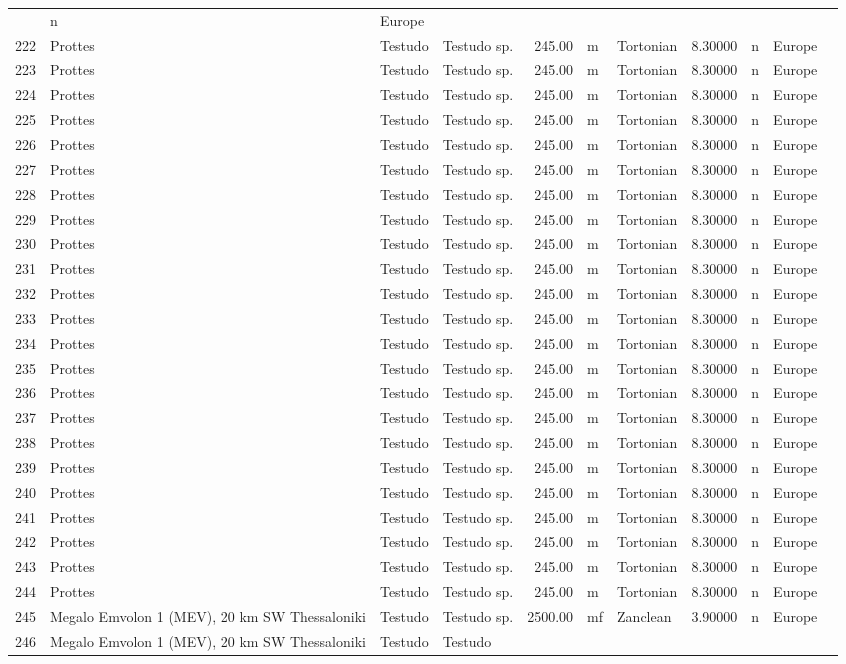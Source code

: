 \begin{landscape}
{\begin{longtable}[]{@{}llllrllrlll@{}}
	& n & Europe\tabularnewline
	222 & Prottes & Testudo & Testudo sp. & 245.00 & m & Tortonian & 8.30000
	& n & Europe\tabularnewline
	223 & Prottes & Testudo & Testudo sp. & 245.00 & m & Tortonian & 8.30000
	& n & Europe\tabularnewline
	224 & Prottes & Testudo & Testudo sp. & 245.00 & m & Tortonian & 8.30000
	& n & Europe\tabularnewline
	225 & Prottes & Testudo & Testudo sp. & 245.00 & m & Tortonian & 8.30000
	& n & Europe\tabularnewline
	226 & Prottes & Testudo & Testudo sp. & 245.00 & m & Tortonian & 8.30000
	& n & Europe\tabularnewline
	227 & Prottes & Testudo & Testudo sp. & 245.00 & m & Tortonian & 8.30000
	& n & Europe\tabularnewline
	228 & Prottes & Testudo & Testudo sp. & 245.00 & m & Tortonian & 8.30000
	& n & Europe\tabularnewline
	229 & Prottes & Testudo & Testudo sp. & 245.00 & m & Tortonian & 8.30000
	& n & Europe\tabularnewline
	230 & Prottes & Testudo & Testudo sp. & 245.00 & m & Tortonian & 8.30000
	& n & Europe\tabularnewline
	231 & Prottes & Testudo & Testudo sp. & 245.00 & m & Tortonian & 8.30000
	& n & Europe\tabularnewline
	232 & Prottes & Testudo & Testudo sp. & 245.00 & m & Tortonian & 8.30000
	& n & Europe\tabularnewline
	233 & Prottes & Testudo & Testudo sp. & 245.00 & m & Tortonian & 8.30000
	& n & Europe\tabularnewline
	234 & Prottes & Testudo & Testudo sp. & 245.00 & m & Tortonian & 8.30000
	& n & Europe\tabularnewline
	235 & Prottes & Testudo & Testudo sp. & 245.00 & m & Tortonian & 8.30000
	& n & Europe\tabularnewline
	236 & Prottes & Testudo & Testudo sp. & 245.00 & m & Tortonian & 8.30000
	& n & Europe\tabularnewline
	237 & Prottes & Testudo & Testudo sp. & 245.00 & m & Tortonian & 8.30000
	& n & Europe\tabularnewline
	238 & Prottes & Testudo & Testudo sp. & 245.00 & m & Tortonian & 8.30000
	& n & Europe\tabularnewline
	239 & Prottes & Testudo & Testudo sp. & 245.00 & m & Tortonian & 8.30000
	& n & Europe\tabularnewline
	240 & Prottes & Testudo & Testudo sp. & 245.00 & m & Tortonian & 8.30000
	& n & Europe\tabularnewline
	241 & Prottes & Testudo & Testudo sp. & 245.00 & m & Tortonian & 8.30000
	& n & Europe\tabularnewline
	242 & Prottes & Testudo & Testudo sp. & 245.00 & m & Tortonian & 8.30000
	& n & Europe\tabularnewline
	243 & Prottes & Testudo & Testudo sp. & 245.00 & m & Tortonian & 8.30000
	& n & Europe\tabularnewline
	244 & Prottes & Testudo & Testudo sp. & 245.00 & m & Tortonian & 8.30000
	& n & Europe\tabularnewline
	245 & Megalo Emvolon 1 (MEV), 20 km SW Thessaloniki & Testudo & Testudo
	sp. & 2500.00 & mf & Zanclean & 3.90000 & n & Europe\tabularnewline
	246 & Megalo Emvolon 1 (MEV), 20 km SW Thessaloniki & Testudo & Testudo

\end{longtable}}
\end{landscape}
